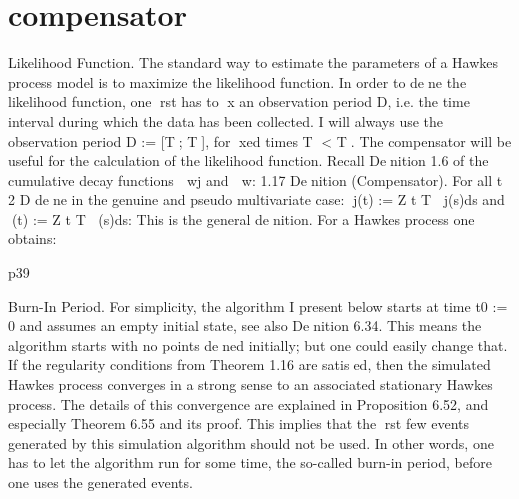 \documentclass[11pt]{book}
\begin{document}
\section{compensator}
Likelihood Function. The standard way to estimate the parameters of a
Hawkes process model is to maximize the likelihood function. In order to
dene the likelihood function, one rst has to x an observation period D, i.e.
the time interval during which the data has been collected. I will always use
the observation period D := [T; T], for xed times T < T.
The compensator will be useful for the calculation of the likelihood function.
Recall Denition 1.6 of the cumulative decay functions  wj and  w:
1.17 Denition (Compensator). For all t 2 D dene in the genuine and
pseudo multivariate case:
j(t) :=
Z t
T
j(s)ds and (t) :=
Z t
T
(s)ds:
This is the general denition. For a Hawkes process one obtains:

p39


Burn-In Period. For simplicity, the algorithm I present below starts at time
t0 := 0 and assumes an empty initial state, see also Denition 6.34. This
means the algorithm starts with no points dened initially; but one could easily
change that. If the regularity conditions from Theorem 1.16 are satised, then
the simulated Hawkes process converges in a strong sense to an associated
stationary Hawkes process. The details of this convergence are explained in
Proposition 6.52, and especially Theorem 6.55 and its proof.
This implies that the rst few events generated by this simulation algorithm
should not be used. In other words, one has to let the algorithm run for some
time, the so-called burn-in period, before one uses the generated events.



\cleardoublepage%
\appendix
\pagestyle{back}





\backmatter
\end{document}
